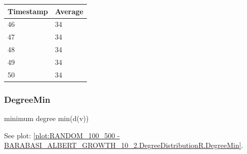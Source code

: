 \begin{tabular}{|l||l|}
\hline
	\textbf{Timestamp} & \textbf{Average} \\ \hline
	46 & 34 \\ \hline
	47 & 34 \\ \hline
	48 & 34 \\ \hline
	49 & 34 \\ \hline
	50 & 34 \\ \hline
\end{tabular}

\subsubsection{DegreeMin}
minimum degree min(d(v))

See plot: \ref{plot:RANDOM_100_500 - BARABASI_ALBERT_GROWTH_10_2.DegreeDistributionR.DegreeMin}.

